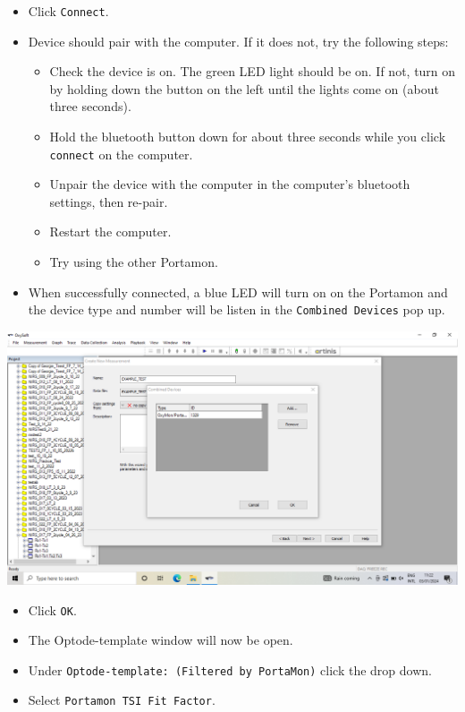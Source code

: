 \documentclass[
]{book}
\providecommand{\tightlist}{%
  \setlength{\itemsep}{0pt}\setlength{\parskip}{0pt}}
\begin{document}
\begin{itemize}
\tightlist
\item
  Click \texttt{Connect}.
\item
  Device should pair with the computer. If it does not, try the following steps:

  \begin{itemize}
  \tightlist
  \item
    Check the device is on. The green LED light should be on. If not, turn on by holding down the button on the left until the lights come on (about three seconds).
  \item
    Hold the bluetooth button down for about three seconds while you click \texttt{connect} on the computer.
  \item
    Unpair the device with the computer in the computer's bluetooth settings, then re-pair.
  \item
    Restart the computer.
  \item
    Try using the other Portamon.
  \end{itemize}
\item
  When successfully connected, a blue LED will turn on on the Portamon and the device type and number will be listen in the \texttt{Combined\ Devices} pop up.
\end{itemize}

\includegraphics[width=1\linewidth]{images/startnewmeasurement/09_successful_connection}

\begin{itemize}
\tightlist
\item
  Click \texttt{OK}.
\item
  The Optode-template window will now be open.
\item
  Under \texttt{Optode-template:\ (Filtered\ by\ PortaMon)} click the drop down.
\item
  Select \texttt{Portamon\ TSI\ Fit\ Factor}.
\end{itemize}
\end{document}
